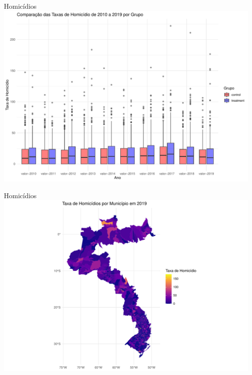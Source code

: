 \documentclass[
  ignorenonframetext,
]{beamer}
\begin{document}
\begin{frame}{Homicídios}
\label{homicuxeddios-2}
\includegraphics{graficos_files/figure-beamer/unnamed-chunk-15-1.pdf}
\end{frame}

\begin{frame}{Homicídios}
\label{homicuxeddios-3}
\includegraphics{graficos_files/figure-beamer/unnamed-chunk-16-1.pdf}
\end{frame}
\end{document}
